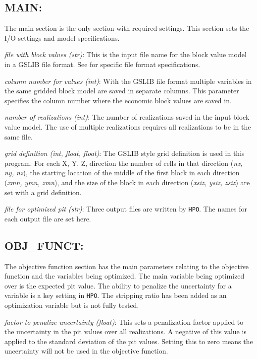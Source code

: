     \subsection{MAIN:}

        The main section is the only section with required settings. This section sets the I/O settings and model specifications.

        \textit{file with block values (str)}: This is the input file name for the block value model in a GSLIB file format. See \cite{Deutsch1998} for specific file format specifications.

        \textit{column number for values (int)}: With the GSLIB file format multiple variables in the same gridded block model are saved in separate columns. This parameter specifies the column number where the economic block values are saved in.

        \textit{number of realizations (int)}: The number of realizations saved in the input block value model. The use of multiple realizations requires all realizations to be in the same file.

        \textit{grid definition (int, float, float)}: The GSLIB style grid definition is used in this program. For each X, Y, Z, direction the number of cells in that direction (\textit{nx, ny, nz}), the starting location of the middle of the first block in each direction (\textit{xmn, ymn, zmn}), and the size of the block in each direction (\textit{xsiz, ysiz, zsiz}) are set with a grid definition.

        \textit{file for optimized pit (str)}: Three output files are written by \texttt{HPO}. The names for each output file are set here.

    \subsection{OBJ\_FUNCT:}

        The objective function section has the main parameters relating to the objective function and the variables being optimized. The main variable being optimized over is the expected pit value. The ability to penalize the uncertainty for a variable is a key setting in \texttt{HPO}. The stripping ratio has been added as an optimization variable but is not fully tested.

        \textit{factor to penalize uncertainty (float)}: This sets a penalization factor applied to the uncertainty in the pit values over all realizations. A negative of this value is applied to the standard deviation of the pit values. Setting this to zero means the uncertainty will not be used in the objective function.

